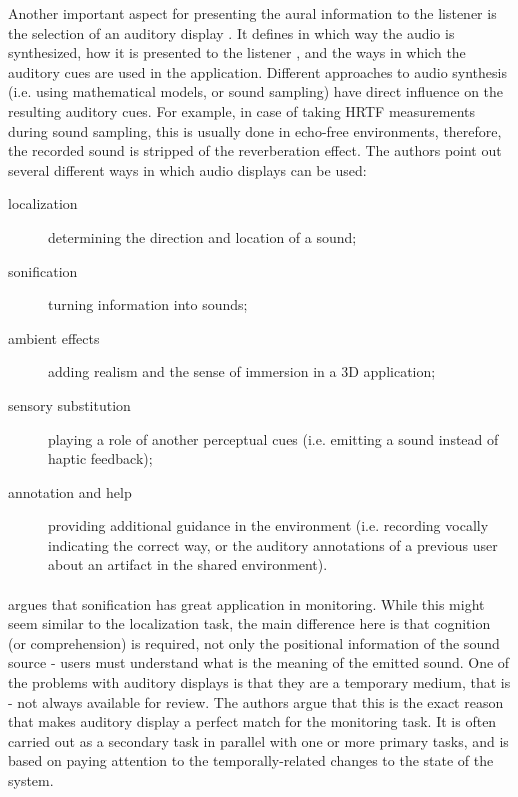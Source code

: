Another important aspect for presenting the aural information to the listener is the selection of an auditory display \cite[p.~153]{jr_3d_2017}. It defines in which way the audio is synthesized, how it is presented to the listener %
, and the ways in which the auditory cues are used in the application.
Different approaches to audio synthesis (i.e. using mathematical models, or sound sampling) have direct influence on the resulting auditory cues. For example, in case of taking HRTF measurements during sound sampling, this is usually done in echo-free environments, therefore, the recorded sound is stripped of the reverberation effect.
The authors point out several different ways in which audio displays can be used:
\begin{description}
	\item[localization] determining the direction and location of a sound;
	\item[sonification] turning information into sounds;
	\item[ambient effects] adding realism and the sense of immersion in a 3D application;
	\item[sensory substitution] playing a role of another perceptual cues (i.e. emitting a sound instead of haptic feedback); 
	\item[annotation and help] providing additional guidance in the environment (i.e. recording vocally indicating the correct way, or the auditory annotations of a previous user about an artifact in the shared environment).
\end{description}

\paragraph[Sonification for monitoring]{}
\cite{hermann_sonification_2011} argues that sonification has great application in monitoring. While this might seem similar to the localization task, the main difference here is that cognition (or comprehension) is required, not only the positional information of the sound source - users must understand what is the meaning of the emitted sound.
One of the problems with auditory displays is that they are a temporary medium, that is - not always available for review. The authors argue that this is the exact reason that makes auditory display a perfect match for the monitoring task. It is often carried out as a secondary task in parallel with one or more primary tasks, and is based on paying attention to the temporally-related changes to the state of the system.

